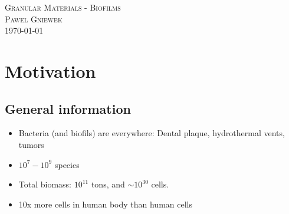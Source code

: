 \documentclass[10pt,a4paper]{article}
\begin{document}
\begin{center}
\textsc{\Large Granular Materials - Biofilms}\\[1.0cm]
\textsc{\LARGE Pawel Gniewek}\\[1.0cm]
\vspace{0.5cm}
\today

\newpage
\tableofcontents
\end{center}

\newpage

\section{Motivation}
\subsection{General information}
\begin{itemize}
 \item Bacteria (and biofils) are everywhere: Dental plaque, hydrothermal vents, tumors
 \item $10^7 - 10^9$ species
 \item Total biomass: $10^{11}$ tons, and $\sim 10^{30}$ cells.
 \item 10x more cells in human body than human cells
\end{itemize}
\end{document}
